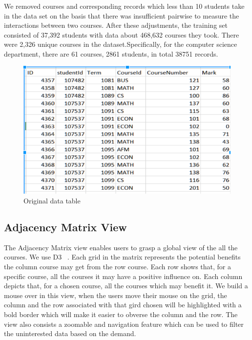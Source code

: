 We removed courses and corresponding records which less than 10 students take in the data set on the basis that there was insufficient pairwise to measure the interactions between two courses. After these adjustments, the training set consisted of 37,392 students with data about 468,632 courses they took. There were 2,326 unique courses in the dataset.Specifically, for the computer science department, there are 61 courses, 2861 students, in total 38751 records.


\begin{figure}[h]
	\centering %
	\includegraphics[width=\columnwidth]{figs/data} 
	\caption{Original data table}
	\label{fig:data}
\end{figure}

\subsection{Adjacency Matrix View}
\label{sec:matrix}
The Adjacency Matrix view enables users to grasp a global view of the all the courses. We use D3 ~\cite{Change Me}. Each grid in the matrix represents the potential benefits the column course may get from the row course. Each row shows that, for a specific course, all the courses it may have a positive influence on. Each column depicts that, for a chosen course, all the courses which may benefit it. We build a mouse over in this view, when the users move their mouse on the grid, the column and the row associated with that gird chosen will be highlighted with a bold border which will make it easier to obverse the column and the row. The view also consists a zoomable and navigation feature which can be used to filter the uninterested data based on the demand. 

